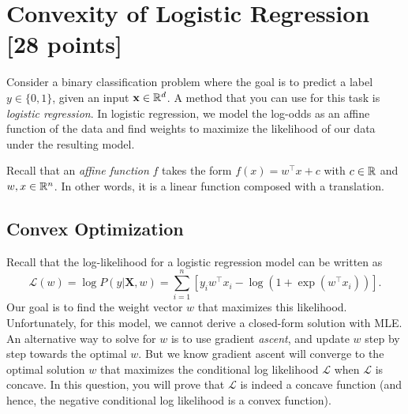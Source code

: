 \section{Convexity of Logistic Regression [28 points]}
Consider a binary classification problem where the goal is to predict a label $y \in \{0,1\}$, given an input $\mathbf{x} \in \mathbb{R}^d$. A method that you can use for this task is \textit{logistic regression}. In logistic regression, we model the log-odds as an affine function of the data and find weights to maximize the likelihood of our data under the resulting model. 

Recall that an \emph{affine function} $f$ takes the form $f(x)=w^\top x + c$ with $c\in\mathbb{R}$ and $w,x\in\mathbb{R}^n$. In other words, it is a linear function composed with a translation.

\subsection{Convex Optimization}
Recall that the log-likelihood for a logistic regression model can be written as 
\begin{equation*}
    \mathcal{L}(w) = \log P(y|\mathbf{X}, w) = \sum_{i=1}^n[y_i w^\top x_i - \log(1+ \exp(w^\top x_i))].
\end{equation*}
Our goal is to find the weight vector $w$ that maximizes this likelihood. Unfortunately, for this model, we cannot derive a closed-form solution with MLE. An alternative way to solve for $w$ is to use gradient \emph{ascent}, and update $w$ step by step towards the optimal $w$. But we know gradient ascent will converge to the optimal solution $w$ that maximizes the conditional log likelihood $\mathcal{L}$ when $\mathcal{L}$ is concave. In this question, you will prove that $\mathcal{L}$ is indeed a concave function (and hence, the negative conditional log likelihood is a convex function). 

